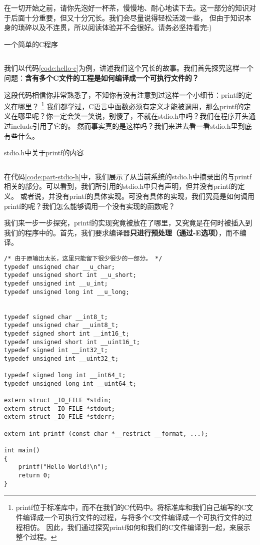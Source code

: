在一切开始之前，请你先泡好一杯茶，慢慢地、耐心地读下去。这一部分的知识对于后面十分重要，但又十分冗长。我们会尽量说得轻松活泼一些，
但由于知识本身的琐碎以及不连贯，所以阅读体验并不会很好。请务必坚持看完:)

\begin{codeBoxWithCaption}{一个简单的C程序\label{code:hello-c}}
  \inputminted[linenos]{c}{codes/hello.c}
\end{codeBoxWithCaption}

我们以代码\ref{code:hello-c}为例，讲述我们这个冗长的故事。我们首先探究这样一个问题：\textbf{含有多个C文件的工程是如何编译成一个可执行文件的？}

这段代码相信你非常熟悉了，不知你有没有注意到过这样一个小细节：printf的定义在哪里？
\footnote{printf位于标准库中，而不在我们的C代码中。将标准库和我们自己编写的C文件编译成一个可执行文件的过程，与将多个C文件编译成一个可执行文件的过程相仿。
因此，我们通过探究printf如何和我们的C文件编译到一起，来展示整个过程。}
我们都学过，C语言中函数必须有定义才能被调用，那么printf的定义在哪里呢？你一定会笑一笑说，别傻了，不就在stdio.h中吗？我们在程序开头通过include引用了它的。
然而事实真的是这样吗？我们来进去看一看stdio.h里到底有些什么。

\begin{codeBoxWithCaption}{stdio.h中关于printf的内容\label{code:part-stdio-h}}
  \inputminted[linenos]{c}{codes/part_of_stdio.h}
\end{codeBoxWithCaption}

在代码\ref{code:part-stdio-h}中，我们展示了从当前系统的stdio.h中摘录出的与printf相关的部分。可以看到，我们所引用的stdio.h中只有声明，但并没有printf的定义。
或者说，并没有printf的具体实现。可没有具体的实现，我们究竟是如何调用printf的呢？我们怎么能够调用一个没有实现的函数呢？

我们来一步一步探究，printf的实现究竟被放在了哪里，又究竟是在何时被插入到我们的程序中的。首先，我们要求编译器\textbf{只进行预处理（通过-E选项）}，而不编译。

\begin{verbatim}
/* 由于原输出太长，这里只能留下很少很少的一部分。 */
typedef unsigned char __u_char;
typedef unsigned short int __u_short;
typedef unsigned int __u_int;
typedef unsigned long int __u_long;


typedef signed char __int8_t;
typedef unsigned char __uint8_t;
typedef signed short int __int16_t;
typedef unsigned short int __uint16_t;
typedef signed int __int32_t;
typedef unsigned int __uint32_t;

typedef signed long int __int64_t;
typedef unsigned long int __uint64_t;

extern struct _IO_FILE *stdin;
extern struct _IO_FILE *stdout;
extern struct _IO_FILE *stderr;

extern int printf (const char *__restrict __format, ...);

int main()
{
    printf("Hello World!\n");
    return 0;
}
\end{verbatim}

